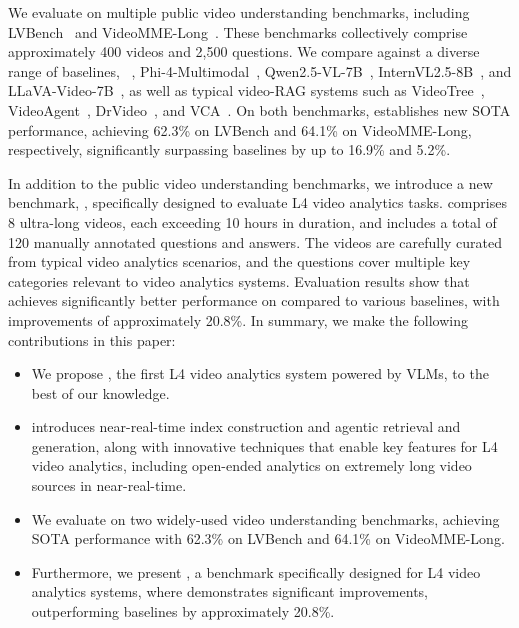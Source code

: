 We evaluate \sysname on multiple public video understanding benchmarks, including LVBench~\cite{wang2024lvbench} and VideoMME-Long~\cite{fu2024videomme}. These benchmarks collectively comprise approximately 400 videos and 2,500 questions. We compare \sysname against a diverse range of baselines, ~\cite{team2023gemini}, Phi-4-Multimodal~\cite{abdin2024phi3}, Qwen2.5-VL-7B~\cite{wang2024qwen2}, InternVL2.5-8B~\cite{chen2024internvl}, and LLaVA-Video-7B~\cite{zhang2024llavavideo}, as well as typical video-RAG systems such as VideoTree~\cite{wang2024videotree}, VideoAgent~\cite{wang2024videoagent}, DrVideo~\cite{ma2024drvideo}, and VCA~\cite{yang2024vca}. On both benchmarks, \sysname establishes new SOTA performance, achieving 62.3\% on LVBench and 64.1\% on VideoMME-Long, respectively, significantly surpassing baselines by up to 16.9\% and 5.2\%.




In addition to the public video understanding benchmarks, we introduce a new benchmark, , specifically designed to evaluate L4 video analytics tasks.  comprises 8 ultra-long videos, each exceeding 10 hours in duration, and includes a total of 120 manually annotated questions and answers. The videos are carefully curated from typical video analytics scenarios, and the questions cover multiple key categories relevant to video analytics systems. Evaluation results show that \sysname achieves significantly better performance on  compared to various baselines, with improvements of approximately 20.8\%. In summary, we make the following contributions in this paper:




\begin{itemize}
    \item We propose \sysname, the first L4 video analytics system powered by VLMs, to the best of our knowledge.
    \item \sysname introduces near-real-time index construction and agentic retrieval and generation, along with innovative techniques that enable key features for L4 video analytics, including open-ended analytics on extremely long video sources in near-real-time.  
    \item We evaluate \sysname on two widely-used video understanding benchmarks, achieving SOTA performance with 62.3\% on LVBench and 64.1\% on VideoMME-Long.  
    \item Furthermore, we present , a benchmark specifically designed for L4 video analytics systems, where \sysname demonstrates significant improvements, outperforming baselines by approximately 20.8\%.  
\end{itemize}


















